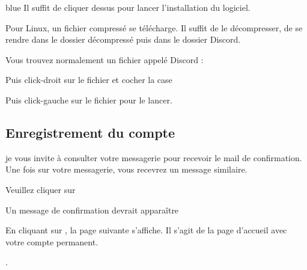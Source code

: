{\begin{items}{blue}{\Triangle}
	Il suffit de cliquer dessus pour lancer l'installation du logiciel.

	\item Pour Linux, un fichier compressé se télécharge. Il suffit de le décompresser, de se rendre dans le dossier décompressé puis dans le dossier Discord. \\


	Vous trouvez normalement un fichier appelé Discord :


	Puis click-droit sur le fichier   et cocher la case 


	Puis click-gauche sur le fichier  pour le lancer.
\end{items}

\subsection{Enregistrement du compte}

je vous invite à consulter votre messagerie pour recevoir le mail de confirmation. \\


Une fois sur votre messagerie, vous recevrez un message similaire.

Veuillez cliquer sur 


Un message de confirmation devrait apparaître 


En cliquant sur , la page suivante s'affiche. Il s'agit de la page d'accueil avec votre compte permanent.\\



. \\

}

